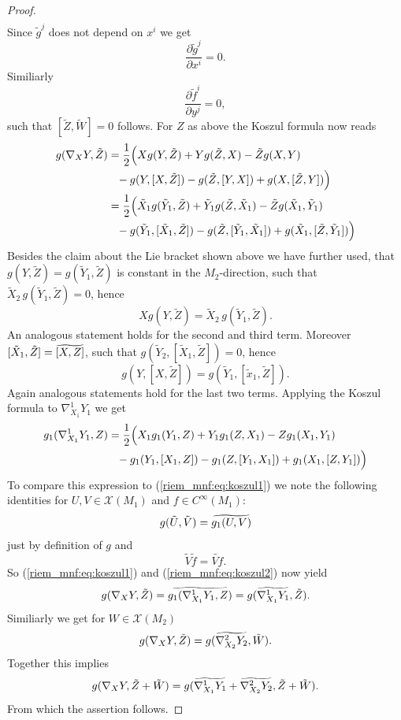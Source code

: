 \begin{proof}
\begin{align*}
    \end{align*}
    Since $\tilde{g}^j$ does not depend on $x^i$ we get 
    $$\frac{\partial \tilde{g}^j}{\partial x^i} =0.$$ 
    Similiarly 
    \[
    \frac{\partial \tilde{f}^i}{\partial y^j} =0,
    \]
    such that $[\tilde{Z},\tilde{W}] = 0$ follows. For $Z$ as above the Koszul formula now reads 
    \begin{align}
        g(\nabla_XY,\tilde{Z}) &= \frac{1}{2}\Big(Xg(Y,\tilde{Z}) + Yg(\tilde{Z},X) - \tilde{Z}g(X,Y) \notag \\
        &\phantom{=} - g(Y,[X,\tilde{Z}]) - g(\tilde{Z},[Y,X]) + g(X,[\tilde{Z},Y])\Big) \notag \\
        &= \frac{1}{2}\Big(\tilde{X}_1g(\tilde{Y}_1,\tilde{Z}) + \tilde{Y}_1g(\tilde{Z},\tilde{X}_1) - \tilde{Z}g(\tilde{X}_1,\tilde{Y}_1) \notag \\
        &\phantom{=} - g(\tilde{Y}_1,[\tilde{X}_1,\tilde{Z}]) - g(\tilde{Z},[\tilde{Y}_1,\tilde{X}_1]) + g(\tilde{X}_1,[\tilde{Z},\tilde{Y}_1])\Big) \label{riem_mnf:eq:koszul1}
    \end{align}
    Besides the claim about the Lie bracket shown above we have further used, that $g(Y,\tilde{Z}) = g(\tilde{Y}_1,\tilde{Z})$ is constant in the $M_2$-direction, such that $\tilde{X}_2\,g(\tilde{Y}_1,\tilde{Z}) = 0$, hence 
    \[
    Xg(Y,\tilde{Z}) = \tilde{X}_2\,g(\tilde{Y}_1,\tilde{Z}).
    \]
    An analogous statement holds for the second and third term. Moreover $[\tilde{X}_1,\tilde{Z}] = \reallywidetilde{[X,Z]}{4.5}$, such that $g(\tilde{Y}_2,[\tilde{X}_1,\tilde{Z}]) = 0$, hence 
    \[
    g(Y,[X,\tilde{Z}]) = g(\tilde{Y}_1,[\tilde{x}_1,\tilde{Z}]).
    \]
    Again analogous statements hold for the last two terms. Applying the Koszul formula to $\nabla^1_{X_1}Y_1$ we get  
    \begin{align}
        g_1(\nabla^1_{X_1}Y_1,Z) &= \frac{1}{2}\Big(X_1g_1(Y_1,Z) + Y_1g_1(Z,X_1) - Zg_1(X_1,Y_1) \notag \\
        &\phantom{=} - g_1(Y_1,[X_1,Z]) - g_1(Z,[Y_1,X_1]) + g_1(X_1,[Z,Y_1])\Big) \label{riem_mnf:eq:koszul2}
    \end{align}
    To compare this expression to (\ref{riem_mnf:eq:koszul1}) we note the following identities for $U,V \in \mathscr{X}(M_1)$ and $f \in C^\infty(M_1)$:
    \[
    g(\tilde{U},\tilde{V}) = \reallywidetilde{g_1(U,V)}{6}
    \]
    just by definition of $g$ and 
    \[
    \tilde{V}\tilde{f} = \widetilde{Vf}.
    \]
    So (\ref{riem_mnf:eq:koszul1}) and (\ref{riem_mnf:eq:koszul2}) now yield 
    \[
    g(\nabla_XY,\tilde{Z}) = \reallywidetilde{g_1(\nabla^1_{X_1}Y_1,Z)}{9} = g(\reallywidetilde{\nabla^1_{X_1}Y_1}{5},\tilde{Z}).
    \]
    Similiarly we get for $W \in \mathscr{X}(M_2)$
    \[
    g(\nabla_XY,\tilde{Z}) = g(\reallywidetilde{\nabla^2_{X_2}Y_2}{5},\tilde{W}).
    \]
    Together this implies
    \[
    g(\nabla_XY,\tilde{Z}+\tilde{W}) = g(\reallywidetilde{\nabla^1_{X_1}Y_1}{5} + \reallywidetilde{\nabla^2_{X_2}Y_2}{5},\tilde{Z}+\tilde{W}).
    \]
    From which the assertion follows.

\end{proof}

